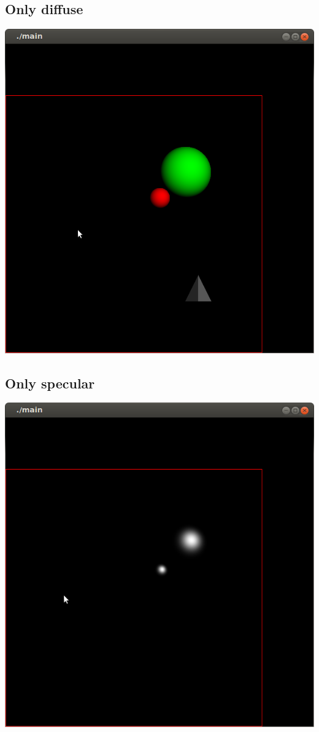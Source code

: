 \documentclass[12pt]{article}
\begin{document}
\subsection{Only diffuse}
\includegraphics[scale=.75]{diffuse.png}
\subsection{Only specular}
\includegraphics[scale=.75]{specular.png}
\end{document}
